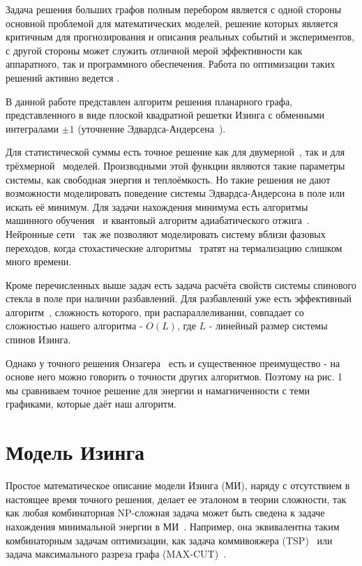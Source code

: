 \documentclass[10pt]{article}
\begin{document}
	Задача решения больших графов полным перебором является с одной стороны основной проблемой для математических моделей, решение которых является критичным для прогнозирования и описания реальных событий и экспериментов, с другой стороны может служить отличной мерой эффективности как аппаратного, так и программного обеспечения. Работа по оптимизации таких решений активно ведется \cite{romero2020high}. 
	
	В данной работе представлен алгоритм решения планарного графа, представленного в виде плоской квадратной решетки Изинга с обменными интегралами $\pm 1$ (уточнение Эдвардса-Андерсена~\cite{roma2010ground, katzgraber2005correlation}). 
	
	Для статистической суммы есть точное решение как для двумерной~\cite{onsager1944crystal}, так и для трёхмерной~\cite{zhang2023exact} моделей. Производными этой функции являются такие параметры системы, как свободная энергия и теплоёмкость. Но такие решения не дают возможности моделировать поведение системы Эдвардса-Андерсона в поле или искать её минимум. Для задачи нахождения минимума есть алгоритмы машинного обучения~\cite{maren1991logical} и квантовый алгоритм адиабатического отжига~\cite{grant2020adiabatic}. Нейронные сети~\cite{Korol2021} так же позволяют моделировать систему вблизи фазовых переходов, когда стохастические алгоритмы~\cite{janke2008monte} тратят на термализацию слишком много времени.
	
	Кроме перечисленных выше задач есть задача расчёта свойств системы спинового стекла в поле при наличии разбавлений. Для разбавлений уже есть эффективный алгоритм~\cite{loh2006efficient}, сложность которого, при распараллеливании, совпадает со сложностью нашего алгоритма - $O(L)$, где $L$ - линейный размер системы спинов Изинга.
	
	Однако у точного решения Онзагера~\cite{onsager1944crystal} есть и существенное преимущество - на основе него можно говорить о точности других алгоритмов. Поэтому на рис. 1 мы сравниваем точное решение для энергии и намагниченности с теми графиками, которые даёт наш алгоритм.
	
	\section{Модель Изинга}
	Простое математическое описание модели Изинга (МИ), наряду с отсутствием в настоящее время точного решения, делает ее эталоном в теории сложности, так как любая комбинаторная NP-сложная задача может быть сведена к задаче нахождения минимальной энергии в МИ~\cite{Markovich2019}. Например, она эквивалентна таким комбинаторным задачам оптимизации, как задача коммивояжера (TSP)~\cite{papadimitriou1977euclidean} или задача максимального разреза графа ({}MAX-CUT)~\cite{karp2010reducibility}.
	
\end{document}

